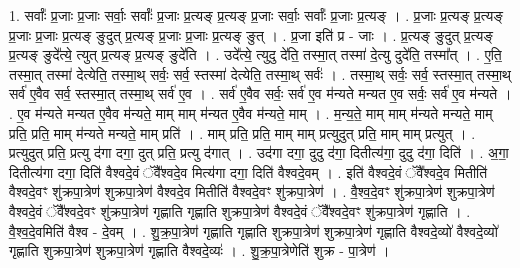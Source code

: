 \documentclass[17pt]{extarticle}
\begin{document}
1. सर्वाः᳚ प्र॒जाः प्र॒जाः सर्वाः॒ सर्वाः᳚ प्र॒जाः प्र॒त्यङ् प्र॒त्यङ् प्र॒जाः सर्वाः॒ सर्वाः᳚ प्र॒जाः प्र॒त्यङ् । . प्र॒जाः प्र॒त्यङ् प्र॒त्यङ् प्र॒जाः प्र॒जाः प्र॒त्यङ् ङुदुत् प्र॒त्यङ् प्र॒जाः प्र॒जाः प्र॒त्यङ्
ङुत् । . प्र॒जा इति॑ प्र - जाः । . प्र॒त्यङ् ङुदुत् प्र॒त्यङ् प्र॒त्यङ् ङुदे᳚त्ये॒ त्युत् प्र॒त्यङ् प्र॒त्यङ् ङुदे॑ति । . उदे᳚त्ये॒ त्युदु दे॑ति॒ तस्मा॒त् तस्मा॑ दे॒त्यु दुदे॑ति॒ तस्मा᳚त् । . ए॒ति॒ तस्मा॒त् तस्मा॑ देत्येति॒ तस्मा॒थ् सर्वः॒ सर्व॒ स्तस्मा॑ देत्येति॒ तस्मा॒थ् सर्वः॑ । . तस्मा॒थ् सर्वः॒ सर्व॒ स्तस्मा॒त् तस्मा॒थ् सर्व॑ ए॒वैव सर्व॒ स्तस्मा॒त् तस्मा॒थ् सर्व॑ ए॒व । . सर्व॑ ए॒वैव सर्वः॒ सर्व॑ ए॒व म॑न्यते मन्यत ए॒व सर्वः॒ सर्व॑ ए॒व म॑न्यते । . ए॒व म॑न्यते मन्यत ए॒वैव म॑न्यते॒ माम् माम् म॑न्यत ए॒वैव म॑न्यते॒ माम् । . म॒न्य॒ते॒ माम् माम् म॑न्यते मन्यते॒ माम् प्रति॒ प्रति॒ माम् म॑न्यते मन्यते॒ माम् प्रति॑ । . माम् प्रति॒ प्रति॒ माम् माम् प्रत्युदुत् प्रति॒ माम् माम् प्रत्युत् । . प्रत्युदुत् प्रति॒ प्रत्यु द॑गा दगा॒ दुत् प्रति॒ प्रत्यु द॑गात् । . उद॑गा दगा॒ दुदु द॑गा॒ दितीत्य॑गा॒ दुदु द॑गा॒ दिति॑ । . अ॒गा॒ दितीत्य॑गा दगा॒ दिति॑ वैश्वदे॒वं ॅवै᳚श्वदे॒व मित्य॑गा दगा॒ दिति॑ वैश्वदे॒वम् । . इति॑ वैश्वदे॒वं ॅवै᳚श्वदे॒व मितीति॑ वैश्वदे॒वꣳ शु॑क्रपा॒त्रेण॑ शुक्रपा॒त्रेण॑ वैश्वदे॒व मितीति॑ वैश्वदे॒वꣳ शु॑क्रपा॒त्रेण॑ । . वै॒श्व॒दे॒वꣳ शु॑क्रपा॒त्रेण॑ शुक्रपा॒त्रेण॑ वैश्वदे॒वं ॅवै᳚श्वदे॒वꣳ शु॑क्रपा॒त्रेण॑ गृह्णाति गृह्णाति शुक्रपा॒त्रेण॑ वैश्वदे॒वं ॅवै᳚श्वदे॒वꣳ शु॑क्रपा॒त्रेण॑ गृह्णाति । . वै॒श्व॒दे॒वमिति॑ वैश्व - दे॒वम् । . शु॒क्र॒पा॒त्रेण॑ गृह्णाति गृह्णाति शुक्रपा॒त्रेण॑ शुक्रपा॒त्रेण॑ गृह्णाति वैश्वदे॒व्यो॑ वैश्वदे॒व्यो॑ गृह्णाति शुक्रपा॒त्रेण॑ शुक्रपा॒त्रेण॑ गृह्णाति वैश्वदे॒व्यः॑ । . शु॒क्र॒पा॒त्रेणेति॑ शुक्र - पा॒त्रेण॑ । \newline
\end{document}
